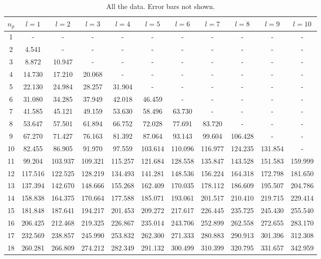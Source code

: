 \documentclass[12pt,twoside]{reedthesis}
\begin{document}
\begin{table}[h]
\begin{adjustwidth}{-1in}{-1in}
	\caption{All the data. Error bars not shown.}
	\label{tab:alldata}
	\begin{tabular}{c|cccccccccc}
		$n_p$	& $l = 1$	& $l = 2$	& $l = 3$	& $l = 4$	& $l = 5$	& $l = 6$	& $l = 7$	& $l = 8$	& $l = 9$	& $l = 10$\\
		\hline
		1	& -	& -	& -	& -	& -	& -	& -	& -	& -	& -\\
		2	& 4.541	& -	& -	& -	& -	& -	& -	& -	& -	& -\\
		3	& 8.872	& 10.947	& -	& -	& -	& -	& -	& -	& -	& -\\
		4	& 14.730	& 17.210	& 20.068	& -	& -	& -	& -	& -	& -	& -\\
		5	& 22.130	& 24.984	& 28.257	& 31.904	& -	& -	& -	& -	& -	& -\\
		6	& 31.080	& 34.285	& 37.949	& 42.018	& 46.459	& -	& -	& -	& -	& -\\
		7	& 41.585	& 45.121	& 49.159	& 53.630	& 58.496	& 63.730	& -	& -	& -	& -\\
		8	& 53.647	& 57.501	& 61.894	& 66.752	& 72.028	& 77.691	& 83.720	& -	& -	& -\\
		9	& 67.270	& 71.427	& 76.163	& 81.392	& 87.064	& 93.143	& 99.604	& 106.428	& -	& -\\
		10	& 82.455	& 86.905	& 91.970	& 97.559	& 103.614	& 110.096	& 116.977	& 124.235	& 131.854	& -\\
		11	& 99.204	& 103.937	& 109.321	& 115.257	& 121.684	& 128.558	& 135.847	& 143.528	& 151.583	& 159.999\\
		12	& 117.516	& 122.525	& 128.219	& 134.493	& 141.281	& 148.536	& 156.224	& 164.318	& 172.798	& 181.650\\
		13	& 137.394	& 142.670	& 148.666	& 155.268	& 162.409	& 170.035	& 178.112	& 186.609	& 195.507	& 204.786\\
		14	& 158.838	& 164.375	& 170.664	& 177.588	& 185.071	& 193.061	& 201.517	& 210.410	& 219.715	& 229.414\\
		15	& 181.848	& 187.641	& 194.217	& 201.453	& 209.272	& 217.617	& 226.445	& 235.725	& 245.430	& 255.540\\
		16	& 206.425	& 212.468	& 219.325	& 226.867	& 235.014	& 243.706	& 252.899	& 262.558	& 272.655	& 283.170\\
		17	& 232.569	& 238.857	& 245.990	& 253.832	& 262.300	& 271.333	& 280.883	& 290.913	& 301.396	& 312.308\\
		18	& 260.281	& 266.809	& 274.212	& 282.349	& 291.132	& 300.499	& 310.399	& 320.795	& 331.657	& 342.959\\

\end{tabular}
\end{adjustwidth}
\end{table}
\end{document}
